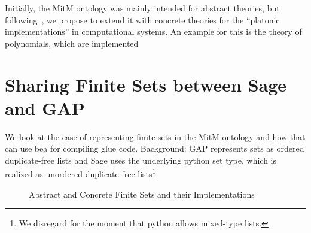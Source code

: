 \documentclass{article}
\def\cn#1{\ensuremath{\mathsf{#1}}}
\begin{document}
Initially, the MitM ontology was mainly intended for abstract theories, but
following~\cite{KohRabSac:fvip11}, we propose to extend it with concrete theories for the
``platonic implementations'' in computational systems. An example for this is the theory
of polynomials, which are implemented 


\section{Sharing Finite Sets between Sage and GAP}

We look at the case of representing finite sets in the MitM ontology and how that can use
bea for compiling glue code. Background: GAP represents sets as ordered duplicate-free
lists and Sage uses the underlying python set type, which is realized as unordered
duplicate-free lists\footnote{We disregard for the moment that python allows mixed-type
  lists.}.

\begin{figure}[ht]\centering
{}
\caption{Abstract and Concrete Finite Sets and their Implementations}\label{fig:sets}
\end{figure}


\printbibliography
\end{document}
